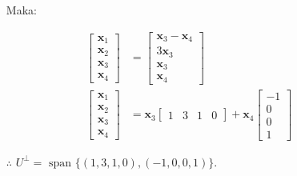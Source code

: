 \documentclass[12pt, a4paper]{scrartcl}
\begin{document}
\begin{enumerate}
\begin{enumerate}
                \pagebreak

                \begin{itemize}
                    \item[] Maka:
                \end{itemize}
                \begin{align*}
                    \begin{bmatrix}
                        \textbf{x}_1 \\ \textbf{x}_2 \\ \textbf{x}_3 \\ \textbf{x}_4
                    \end{bmatrix} &= \begin{bmatrix}
                        \textbf{x}_3 - \textbf{x}_4 \\ 3\textbf{x}_3 \\ \textbf{x}_3 \\ \textbf{x}_4
                    \end{bmatrix}
                    \\ \begin{bmatrix}
                        \textbf{x}_1 \\ \textbf{x}_2 \\ \textbf{x}_3 \\ \textbf{x}_4
                    \end{bmatrix} &= \textbf{x}_3 \begin{bmatrix}
                        1 & 3 & 1 & 0
                    \end{bmatrix} + \textbf{x}_4 \begin{bmatrix}
                        -1 \\ 0 \\ 0 \\ 1
                    \end{bmatrix}
                \end{align*}

                \begin{itemize}
                    \item[$\therefore$] $U^\perp = \mbox{ span } \{(1,3,1,0), (-1,0,0,1)\}$.
                \end{itemize}

            \end{enumerate}
        \end{enumerate}
\end{document}
